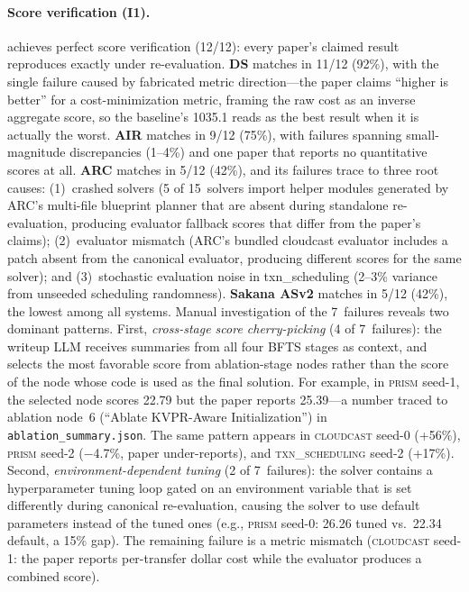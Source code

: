 \paragraph{Score verification (I1).}
\textbf{\sys{}} achieves perfect score verification (12/12): every paper's claimed result reproduces exactly under re-evaluation.
\textbf{DS} matches in 11/12 (92\%), with the single failure caused by fabricated metric direction---the paper claims ``higher is better'' for a cost-minimization metric, framing the raw cost as an inverse aggregate score, so the baseline's 1035.1 reads as the best result when it is actually the worst.
\textbf{AIR} matches in 9/12 (75\%), with failures spanning small-magnitude discrepancies (1--4\%) and one paper that reports no quantitative scores at all.
\textbf{ARC} matches in 5/12 (42\%), and its failures trace to three root causes: (1)~crashed solvers (5 of 15~solvers import helper modules generated by ARC's multi-file blueprint planner that are absent during standalone re-evaluation, producing evaluator fallback scores that differ from the paper's claims); (2)~evaluator mismatch (ARC's bundled cloudcast evaluator includes a patch absent from the canonical evaluator, producing different scores for the same solver); and (3)~stochastic evaluation noise in txn\_scheduling (2--3\% variance from unseeded scheduling randomness).
\textbf{Sakana ASv2} matches in 5/12 (42\%), the lowest among all systems.
Manual investigation of the 7~failures reveals two dominant patterns.
First, \emph{cross-stage score cherry-picking} (4 of 7~failures): the writeup LLM receives summaries from all four BFTS stages as context, and selects the most favorable score from ablation-stage nodes rather than the score of the node whose code is used as the final solution.
For example, in \textsc{prism} seed-1, the selected node scores 22.79 but the paper reports 25.39---a number traced to ablation node~6 (``Ablate KVPR-Aware Initialization'') in \texttt{ablation\_summary.json}.
The same pattern appears in \textsc{cloudcast} seed-0 (+56\%), \textsc{prism} seed-2 ($-$4.7\%, paper under-reports), and \textsc{txn\_scheduling} seed-2 (+17\%).
Second, \emph{environment-dependent tuning} (2 of 7~failures): the solver contains a hyperparameter tuning loop gated on an environment variable that is set differently during canonical re-evaluation, causing the solver to use default parameters instead of the tuned ones (e.g., \textsc{prism} seed-0: 26.26 tuned vs.\ 22.34 default, a 15\% gap).
The remaining failure is a metric mismatch (\textsc{cloudcast} seed-1: the paper reports per-transfer dollar cost while the evaluator produces a combined score).

